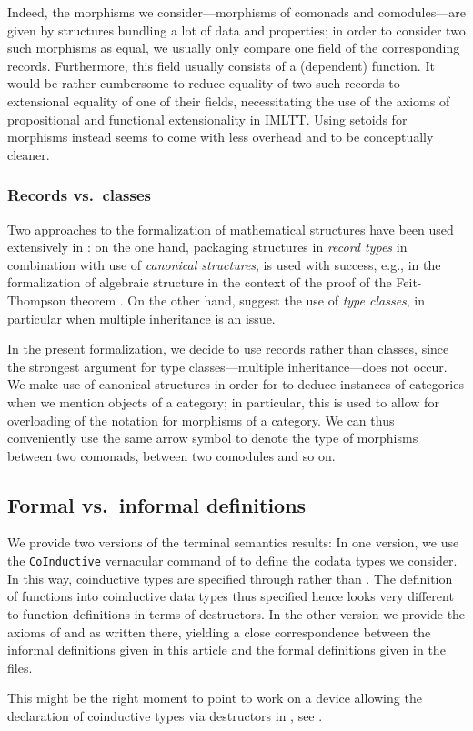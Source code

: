 \documentclass[envcountsame]{llncs}
\begin{document}
\begin{Long}
Indeed, the morphisms we consider---morphisms of comonads and comodules---are given by structures
bundling a lot of data and properties; in order to consider two such morphisms as equal, we usually only compare one field of the 
corresponding records. Furthermore, this field usually consists of a (dependent) function.
It would be rather cumbersome to reduce equality of two such records to extensional equality of one of their fields, 
necessitating the use of the axioms of propositional and functional extensionality in IMLTT.
Using setoids for morphisms instead seems to come with less overhead and to be conceptually cleaner.



\subsubsection{Records vs.\ classes}
Two approaches to the formalization of mathematical structures have been used extensively in \coq: on the one hand, packaging structures
in \emph{record types}  in combination with use of \emph{canonical structures}, is used with success, e.g., in 
the formalization of algebraic structure in the context of the proof of the Feit-Thompson theorem \parencite{DBLP:conf/tphol/GarillotGMR09}.
On the other hand, \textcite{DBLP:journals/mscs/SpittersW11} suggest the use of \emph{type classes}, in particular when multiple inheritance
is an issue.

In the present formalization, we decide to use records rather than classes, since the strongest argument for type classes---multiple inheritance---does 
not occur.
We make use of canonical structures in order for \coq to deduce instances of categories when we mention objects of a category; 
in particular, this is used to allow for overloading of the notation for morphisms of a category.
We can thus conveniently use the same arrow symbol to denote the type of morphisms between two comonads, between two comodules and so on.


\subsection{Formal vs.\ informal definitions}

We provide two versions of the terminal semantics results:
In one version, we use the \lstinline!CoInductive! vernacular command of \coq to define the codata types we consider.
In this way, coinductive types are specified through  rather than . The definition
of functions into coinductive data types thus specified hence looks very different to function definitions 
in terms of destructors.
In the other version we provide the axioms of  and  as written there,
yielding a close correspondence between the informal definitions given in this article and the formal definitions given in 
the \coq files.

This might be the right moment to point to work on a device allowing the declaration of coinductive types via destructors in \agda, 
see \parencite{DBLP:conf/popl/AbelPTS13}.

\end{Long}
\end{document}
